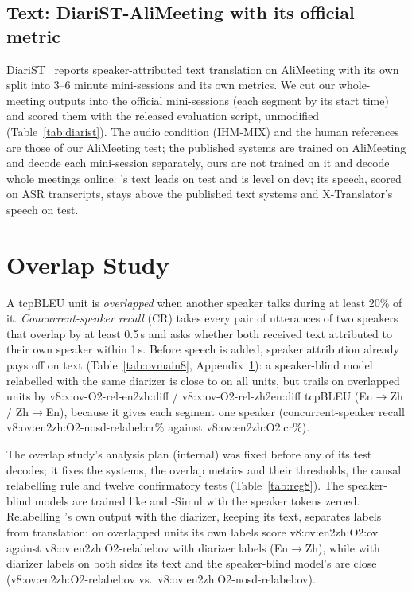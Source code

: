 \subsection{Text: DiariST-AliMeeting with its official metric}
\label{app:diarist}
DiariST~\citep{yang2024diarist} reports speaker-attributed text translation on AliMeeting with its own split into 3--6
minute mini-sessions and its own metrics. We cut our whole-meeting outputs into the official mini-sessions (each
segment by its start time) and scored them with the released evaluation script, unmodified (Table~\ref{tab:diarist}).
The audio condition (IHM-MIX) and the human references are those of our AliMeeting test; the published systems are
trained on AliMeeting and decode each mini-session separately, ours are not trained on it and decode whole meetings
online. \sys{}'s text leads on test and is level on dev; its speech, scored on ASR transcripts, stays above the
published text systems and X-Translator's speech on test.


\section{Overlap Study}
\label{app:v8}
\label{sec:eval-overlap}

A tcpBLEU unit is \emph{overlapped} when another speaker talks during at least 20\% of it. \emph{Concurrent-speaker
recall} (CR) takes every pair of utterances of two speakers that overlap by at least 0.5\,s and asks whether both
received text attributed to their own speaker within 1\,s. Before speech is added, speaker attribution already pays off on text (Table~\ref{tab:ovmain8}, Appendix~\ref{app:v8}):
a speaker-blind model relabelled with the same diarizer is close to \sys{} on all units, but trails on overlapped units by
\num{v8:x:ov-O2-rel-en2zh:diff} / \num{v8:x:ov-O2-rel-zh2en:diff} tcpBLEU (En$\rightarrow$Zh / Zh$\rightarrow$En),
because it gives each segment one speaker (concurrent-speaker recall \num{v8:ov:en2zh:O2-nosd-relabel:cr}\% against
\num{v8:ov:en2zh:O2:cr}\%).


The overlap study's analysis plan (internal) was fixed before any of its test decodes; it fixes the systems, the overlap
metrics and their thresholds, the causal relabelling rule and twelve confirmatory tests (Table~\ref{tab:reg8}). The
speaker-blind models are trained like \sys{} and \sys{}-Simul with the speaker tokens zeroed. Relabelling \sys{}'s own
output with the diarizer, keeping its text, separates labels from translation: on overlapped units its own labels score
\num{v8:ov:en2zh:O2:ov} against \num{v8:ov:en2zh:O2-relabel:ov} with diarizer labels (En$\rightarrow$Zh), while with
diarizer labels on both sides its text and the speaker-blind model's are close
(\num{v8:ov:en2zh:O2-relabel:ov} vs.\ \num{v8:ov:en2zh:O2-nosd-relabel:ov}).

